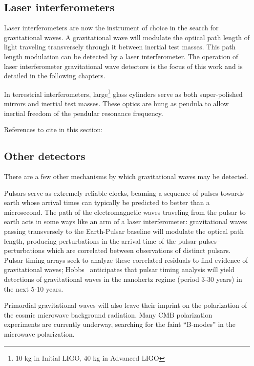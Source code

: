 \subsection{Laser interferometers}

Laser interferometers are now the instrument of choice in the search
for gravitational waves.  A gravitational wave will modulate the
optical path length of light traveling transversely through it between
inertial test masses.  This path length modulation can be detected by
a laser interferometer.  The operation of laser interferometer
gravitational wave detectors is the focus of this work and is detailed
in the following chapters.

In terrestrial interferometers, large\footnote{10 kg in Initial LIGO,
  40 kg in Advanced LIGO} glass cylinders serve as both super-polished
mirrors and inertial test masses.  These optics are hung as pendula to
allow inertial freedom of the pendular resonance frequency.

References to cite in this section: \cite{Weiss1972Electromagnetically,Forward1978Wideband}

\subsection{Other detectors}

There are a few other mechanisms by which gravitational waves may be
detected.

Pulsars serve as extremely reliable clocks, beaming a sequence of
pulses towards earth whose arrival times can typically be predicted to
better than a microsecond.  The path of the electromagnetic waves
traveling from the pulsar to earth acts in some ways like an arm of a
laser interferometer: gravitational waves passing transversely to the
Earth-Pulsar baseline will modulate the optical path length, producing
perturbations in the arrival time of the pulsar pulses--perturbations
which are correlated between observations of distinct pulsars. Pulsar
timing arrays seek to analyze these correlated residuals to find
evidence of gravitational waves;
Hobbs~\cite{Hobbs2009International} anticipates that pulsar timing
analysis will yield detections of gravitational waves in the nanohertz
regime (period 3-30 years) in the next 5-10 years.

Primordial gravitational waves will also leave their imprint on the
polarization of the cosmic microwave background radiation.  Many CMB
polarization experiments are currently underway, searching for the
faint ``B-modes'' in the microwave polarization.

